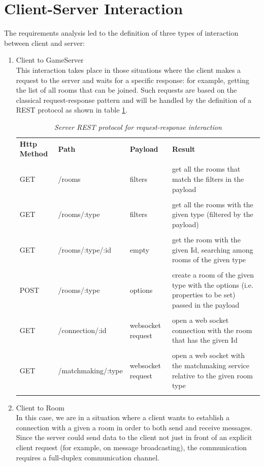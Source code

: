 \section{Client-Server Interaction}
The requirements analysis led to the definition of three types of interaction between client and server:
\begin{enumerate}
	\item Client to GameServer \\
	This interaction takes place in those situations where the client makes a request to the server and waits for a specific response: for example, getting the list of all rooms that can be joined. Such requests are based on the classical request-response pattern and will be handled by the definition of a REST protocol as shown in table
	 \ref{table:server_routes}.
	\begin{table}[]
		\begin{tabular}{p{2cm}p{4cm}p{2cm}p{5.5cm}}
			\textbf{Http Method} & \textbf{Path}	  & \textbf{Payload}  & \textbf{Result}                                                            		\\\\
			GET                  & /rooms             & filters           & get all the rooms that match the filters in the payload                        	\\\\
			GET                  & /rooms/:type       & filters           & get all the rooms with the given type (filtered by the payload)     	\\\\
			GET                  & /rooms/:type/:id   & empty             & get the room with the given Id, searching among rooms of the given type         	\\\\
			POST                 & /rooms/:type       & options           & create a room of the given type with the options (i.e. properties to be set) passed in the payload          	\\\\
			GET                  & /connection/:id    & websocket request & open a web socket connection with the room that has the given Id               	\\\\
			GET                  & /matchmaking/:type & websocket request & open a web socket with the matchmaking service relative to the given room type 	\\\\
		\end{tabular}
		\caption{\label{table:server_routes} \textit{Server REST protocol for request-response interaction}}
	\end{table}
	\item  Client to Room \\
	In this case, we are in a situation where a client wants to establish a connection with a given a room in order to both send and receive messages. Since the server could send data to the client not just in front of an explicit client request (for example, on message broadcasting), the communication requires a full-duplex communication channel.
	

\end{enumerate}
